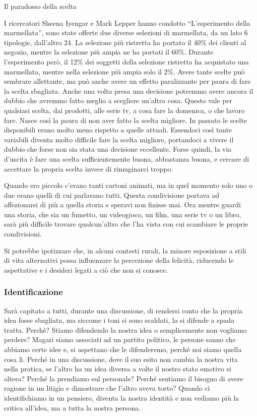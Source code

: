 \documentclass[12pt]{book} %
\begin{document}
\begin{mdframed}[linewidth=1pt]
Il paradosso della scelta

I ricercatori Sheena Iyengar e Mark Lepper hanno condotto “L'esperimento della marmellata”, sono
state offerte due diverse selezioni di marmellata, da un lato 6 tipologie, dall'altro 24. La
selezione più ristretta ha portato il 40\% dei clienti al negozio, mentre la selezione più ampia ne ha portati il 60\%.
Durante l'esperimento però, il 12\% dei soggetti della selezione ristretta ha acquistato una
marmellata, mentre nella selezione più ampia solo il 2\%. Avere tante scelte può sembrare allettante, ma può anche
avere un effetto paralizzante per paura di fare la scelta sbagliata. Anche una volta presa una decisione potremmo avere ancora
il dubbio che avremmo fatto meglio a scegliere un'altra cosa. Questo vale per qualsiasi scelta, dai prodotti, alle
serie tv, a cosa fare la domenica, o che lavoro fare. Nasce così la paura di non aver
fatto la scelta migliore. In passato le scelte disponibili erano molto meno rispetto a quelle attuali. Essendoci così
tante variabili diventa molto difficile fare la scelta migliore, portandoci a vivere il dubbio che forse non sia
stata una decisione eccellente. Forse quindi, la via d'uscita è fare una scelta sufficientemente
buona, abbastanza buona, e cercare di accettare la propria scelta invece di rimuginarci troppo.

Quando ero piccolo c'erano tanti cartoni animati, ma in quel momento solo uno o due erano quelli di cui parlavano tutti. Questa condivisione portava ad affezionarsi di più a quella storia e speravi non finisse mai. Ora mentre guardi una storia, che sia un fumetto, un videogioco, un film, una serie tv o un libro, sarà più difficile trovare qualcun'altro che l'ha vista con cui scambiare le proprie condivisioni.

Si potrebbe ipotizzare che, in alcuni contesti rurali, la minore esposizione a stili di vita alternativi possa influenzare la percezione della felicità, riducendo le aspettative e i desideri legati a ciò che non si conosce.
\end{mdframed}

\subsubsection{Identificazione}
Sarà capitato a tutti, durante una discussione, di rendersi conto che la propria idea fosse sbagliata, ma siccome i toni si sono scaldati, la si difende a spada tratta. Perchè? Stiamo difendendo la nostra idea o semplicemente non vogliamo perdere? Magari siamo associati ad un partito politico, le persone sanno che abbiamo certe idee e, si aspettano che le difenderemo, perché noi siamo quella cosa lì. Perché in una discussione, dove il suo esito non cambia la nostra vita nella pratica, se l'altro ha un idea diversa a volte il nostro stato emotivo si altera? Perché la prendiamo sul personale? Perché sentiamo il bisogno di avere ragione in un litigio e dimostrare che l'altro aveva torto? 
Quando ci identifichiamo in un pensiero, diventa la nostra identità e non vediamo più la critica all'idea, ma a tutta la nostra persona. 
\end{document}
